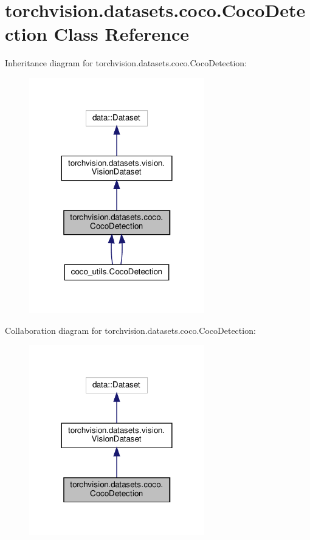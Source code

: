 \hypertarget{classtorchvision_1_1datasets_1_1coco_1_1CocoDetection}{}\section{torchvision.\+datasets.\+coco.\+Coco\+Detection Class Reference}
\label{classtorchvision_1_1datasets_1_1coco_1_1CocoDetection}


Inheritance diagram for torchvision.\+datasets.\+coco.\+Coco\+Detection\+:
\nopagebreak
\begin{figure}[H]
\begin{center}
\leavevmode
\includegraphics[width=216pt]{classtorchvision_1_1datasets_1_1coco_1_1CocoDetection__inherit__graph}
\end{center}
\end{figure}


Collaboration diagram for torchvision.\+datasets.\+coco.\+Coco\+Detection\+:
\nopagebreak
\begin{figure}[H]
\begin{center}
\leavevmode
\includegraphics[width=216pt]{classtorchvision_1_1datasets_1_1coco_1_1CocoDetection__coll__graph}
\end{center}
\end{figure}
